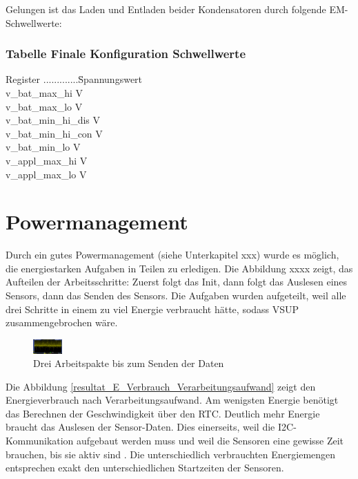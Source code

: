 Gelungen ist das Laden und Entladen beider Kondensatoren durch folgende EM-Schwellwerte:

\subsubsection*{Tabelle Finale Konfiguration Schwellwerte }
\begin{tabbing}
    Register .............\quad\= Spannungswert \\[0.8ex]
    v\_bat\_max\_hi        V \\
    v\_bat\_max\_lo        V \\
    v\_bat\_min\_hi\_dis   V \\
    v\_bat\_min\_hi\_con   V \\
    v\_bat\_min\_lo        V \\
    v\_appl\_max\_hi       V \\
    v\_appl\_max\_lo       V \\   
\end{tabbing}  



\section{Powermanagement}

Durch ein gutes Powermanagement (siehe Unterkapitel xxx) wurde es möglich, die energiestarken Aufgaben in Teilen zu erledigen. Die Abbildung xxxx zeigt, das Aufteilen der Arbeitsschritte: Zuerst folgt das Init, dann folgt das Auslesen eines Sensors, dann das Senden des Sensors. Die Aufgaben wurden aufgeteilt, weil alle drei Schritte in einem zu viel Energie verbraucht hätte, sodass VSUP zusammengebrochen wäre.

\begin{figure}[ht]
    \includegraphics[width=0.1\textwidth]{4Resultate/imag/SpannungVCC.png} 
    \caption{Drei Arbeitspakte bis zum Senden der Daten }
    \label{blub}
\end{figure}


Die Abbildung \ref{resultat_E_Verbrauch_Verarbeitungsaufwand} zeigt den Energieverbrauch nach Verarbeitungsaufwand. Am wenigsten Energie benötigt das Berechnen der Geschwindigkeit über den RTC. Deutlich mehr Energie braucht das Auslesen der Sensor-Daten. Dies einerseits, weil die I2C-Kommunikation aufgebaut werden muss und weil die Sensoren eine gewisse Zeit brauchen, bis sie aktiv sind . Die unterschiedlich verbrauchten Energiemengen entsprechen exakt den unterschiedlichen Startzeiten der Sensoren. 

